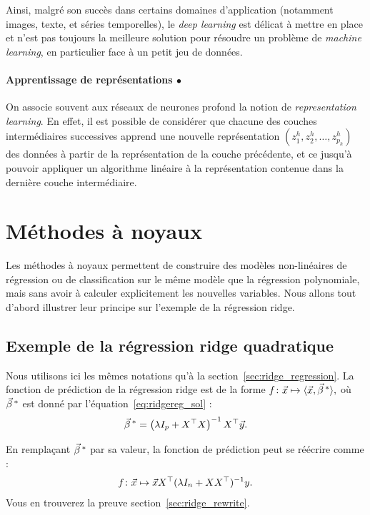Ainsi, malgré son succès dans certains domaines d'application (notamment
images, texte, et séries temporelles), le \textit{deep learning} est délicat à
mettre en place et n'est pas toujours la meilleure solution pour résoudre un
problème de \textit{machine learning}, en particulier face à un petit jeu de
données.

\paragraph{Apprentissage de représentations $\bullet$}
On associe souvent aux réseaux de neurones profond la notion de {\it
  representation learning}. En effet, il est possible de considérer que chacune
des couches intermédiaires successives apprend une nouvelle représentation
$(z^h_1, z^h_2, \dots, z^h_{p_h})$ des données à partir de la représentation de
la couche précédente, et ce jusqu'à pouvoir appliquer un algorithme linéaire à
la représentation contenue dans la dernière couche intermédiaire.


\section{Méthodes à noyaux}
Les méthodes à noyaux permettent de construire des modèles non-linéaires de
régression ou de classification sur le même modèle que la régression
polynomiale, mais sans avoir à calculer explicitement les nouvelles variables. 
Nous allons tout d'abord illustrer leur principe sur l'exemple de la régression ridge.

\subsection{Exemple de la régression ridge quadratique}

Nous utilisons ici les mêmes notations qu'à la section~\ref{sec:ridge_regression}.
La fonction de prédiction de la régression ridge est de la forme
  $f\colon \xx \mapsto \langle \xx,  \bbeta^* \rangle,$
où $\bbeta^*$ est donné par l'équation~\eqref{eq:ridgereg_sol} :
\begin{equation}
  \label{eq:reg_ridge_beta}
  \bbeta^* =  \left( \lambda I_p + X^\top X  \right)^{-1} X^\top \yy.
\end{equation}
  
En remplaçant $\bbeta^*$ par sa valeur, la fonction de prédiction peut se réécrire comme :
\begin{equation}
  \label{eq:reg_ridge_2}
  f\colon \xx \mapsto \xx X^\top (\lambda I_n + XX^\top)^{-1} y.
\end{equation}
Vous en trouverez la preuve section~\ref{sec:ridge_rewrite}.


